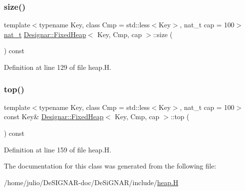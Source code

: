 \subsubsection{\texorpdfstring{size()}{size()}}
{\footnotesize\ttfamily template$<$typename Key, class Cmp = std\+::less$<$\+Key$>$, nat\+\_\+t cap = 100$>$ \\
\hyperlink{namespace_designar_aa72662848b9f4815e7bf31a7cf3e33d1}{nat\+\_\+t} \hyperlink{class_designar_1_1_fixed_heap}{Designar\+::\+Fixed\+Heap}$<$ Key, Cmp, cap $>$\+::size (\begin{DoxyParamCaption}{ }\end{DoxyParamCaption}) const\hspace{0.3cm}{\ttfamily [inline]}}



Definition at line 129 of file heap.\+H.

\mbox{\label{class_designar_1_1_fixed_heap_a2b48592e01a0b8836a18415219a310ca}} 
\subsubsection{\texorpdfstring{top()}{top()}}
{\footnotesize\ttfamily template$<$typename Key, class Cmp = std\+::less$<$\+Key$>$, nat\+\_\+t cap = 100$>$ \\
const Key\& \hyperlink{class_designar_1_1_fixed_heap}{Designar\+::\+Fixed\+Heap}$<$ Key, Cmp, cap $>$\+::top (\begin{DoxyParamCaption}{ }\end{DoxyParamCaption}) const\hspace{0.3cm}{\ttfamily [inline]}}



Definition at line 159 of file heap.\+H.



The documentation for this class was generated from the following file\+:\begin{DoxyCompactItemize}
\item 
/home/julio/\+De\+S\+I\+G\+N\+A\+R-\/doc/\+De\+Si\+G\+N\+A\+R/include/\hyperlink{heap_8_h}{heap.\+H}\end{DoxyCompactItemize}

